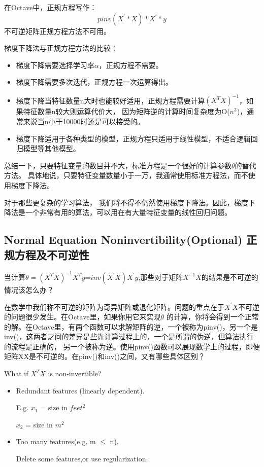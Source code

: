 \documentclass[UTF8]{ctexart}
\begin{document}
在Octave中，正规方程写作：
\begin{equation*}
 pinv(X^{'}*X)*X^{'}*y
\end{equation*}
不可逆矩阵正规方程方法不可用。

梯度下降法与正规方程方法的比较：
\begin{itemize}
 \item 梯度下降需要选择学习率$\alpha$，正规方程不需要。
 \item 梯度下降需要多次迭代，正规方程一次运算得出。
 \item 梯度下降当特征数量n大时也能较好适用，正规方程需要计算$(X^{T}X)^{-1}$，如果特征数量n较大则运算代价大，
 因为矩阵逆的计算时间复杂度为O($n^{3}$)，通常来说当n小于10000时还是可以接受的。
 \item 梯度下降适用于各种类型的模型，正规方程只适用于线性模型，不适合逻辑回归模型等其他模型。
\end{itemize}

 总结一下，只要特征变量的数目并不大，标准方程是一个很好的计算参数$\theta$的替代方法。
 具体地说，只要特征变量数量小于一万，我通常使用标准方程法，而不使用梯度下降法。

 对于那些更复杂的学习算法，
我们将不得不仍然使用梯度下降法。因此，梯度下降法是一个非常有用的算法，可以用在有大量特征变量的线性回归问题。

\subsection{Normal Equation Noninvertibility(Optional) 正规方程及不可逆性}
当计算$\theta=(X^{T}X)^{-1}X^{T}y$=$inv(X^{'}X)X^{'}y$,那些对于矩阵$X^{-1}X$的结果是不可逆的情况该怎么办？

在数学中我们称不可逆的矩阵为奇异矩阵或退化矩阵。问题的重点在于$X^{'}X$不可逆的问题很少发生。在Octave里，如果你用它来实现$\theta$
的计算，你将会得到一个正常的解。在Octave里，有两个函数可以求解矩阵的逆，一个被称为pinv()，另一个是inv()，这两者之间的差异是些许计算过程上的，一个是所谓的伪逆，但算法执行的流程是正确的，
另一个被称为逆。使用pinv()函数可以展现数学上的过程，即便矩阵X\'X是不可逆的。在pinv()和inv()之间，又有哪些具体区别？

What if $X^{T}X$ is non-invertible?
\begin{itemize}
  \item Redundant features (linearly dependent).

        E.g. $x_1$ = size in $feet^{2}$

             $x_2$ = size in $m^{2}$
  \item Too many features(e.g. m $\leq$ n).

        \- Delete some features,or use regularization.
\end{itemize}
\end{document}
